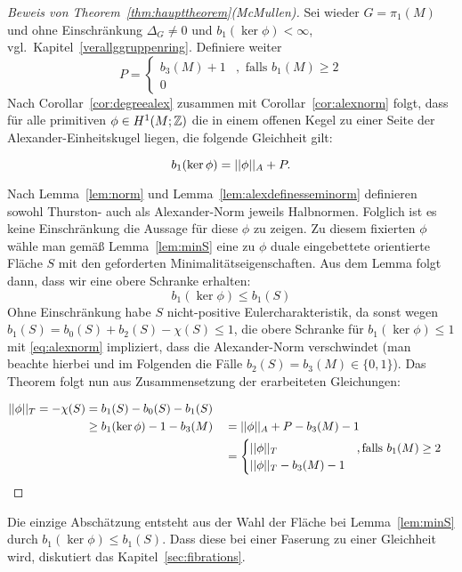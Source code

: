 \begin{proof}[Beweis von Theorem~\ref{thm:haupttheorem}(McMullen)]
    Sei wieder $G=\pi_1(M)$ und ohne Einschränkung $\Delta_G\neq 0$ und $b_1(\ker\phi)<\infty$, vgl.\ Kapitel~\ref{verallggruppenring}. Definiere weiter \[
    P=\begin{cases}
        b_3(M)+1 &, \text{ falls } b_1(M) \geq 2    \\
        0
    \end{cases}
    \]  
    Nach Corollar~\ref{cor:degreealex} zusammen mit Corollar~\ref{cor:alexnorm} folgt, dass für alle primitiven $\phi \in H^1(M;\mathbb{Z})$ die in einem offenen Kegel zu einer Seite der Alexander-Einheitskugel liegen, die folgende Gleichheit gilt:
    
        \begin{equation}
        b_1(\ker\phi)= ||\phi||_A + P \label{eq:alexnorm}.
        \end{equation}
    
    Nach Lemma~\ref{lem:norm} und Lemma~\ref{lem:alexdefinesseminorm} definieren sowohl Thurston- auch als Alexander-Norm jeweils Halbnormen. Folglich ist es keine Einschränkung die Aussage für diese $\phi$ zu zeigen. Zu diesem fixierten $\phi$ wähle man gemäß Lemma~\ref{lem:minS} eine zu $\phi$ duale eingebettete orientierte Fläche $S$ mit den geforderten Minimalitätseigenschaften. Aus dem Lemma folgt dann, dass wir eine obere Schranke erhalten:
    \begin{equation}
        b_1(\ker\phi) \leq b_1(S) \label{eq:obereSchrankeS}
    \end{equation}
    Ohne Einschränkung habe $S$ nicht-positive Eulercharakteristik, da sonst wegen $b_1(S)= b_0(S) + b_2(S) - \chi(S) \leq 1$, die obere Schranke für $b_1(\ker\phi)\leq 1$  mit \eqref{eq:alexnorm} impliziert, dass die Alexander-Norm verschwindet (man beachte hierbei und im Folgenden die Fälle $b_2(S)=b_3(M) \in \{0,1\}$). Das Theorem folgt nun aus Zusammensetzung der erarbeiteten Gleichungen:
    
        \begin{align*}
        ||\phi||_T = -\chi(S) &= b_1(S)-b_0(S)-b_1(S)\\
                    &\geq b_1(\ker\phi) -1-b_3(M) &&= ||\phi||_A +P -b_3(M)-1\\
                    &&& = \begin{cases}
                        ||\phi||_T &, \text{falls } b_1(M)\geq 2\\
                        ||\phi||_T -b_3(M)-1
                    \end{cases}
        \end{align*}
\end{proof} 
    Die einzige Abschätzung entsteht aus der Wahl der Fläche bei Lemma~\ref{lem:minS} durch $b_1(\ker\phi)\leq b_1(S)$. Dass diese bei einer Faserung zu einer Gleichheit wird, diskutiert das Kapitel~\ref{sec:fibrations}. 


